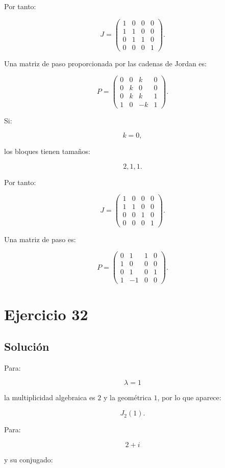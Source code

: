 \documentclass[11pt,a4paper]{article}
\begin{document}
Por tanto:

\[
\boxed{
J=
\begin{pmatrix}
1&0&0&0\\
1&1&0&0\\
0&1&1&0\\
0&0&0&1
\end{pmatrix}.
}
\]

Una matriz de paso proporcionada por las cadenas de Jordan es:

\[
\boxed{
P=
\begin{pmatrix}
0&0&k&0\\
0&k&0&0\\
0&k&k&1\\
1&0&-k&1
\end{pmatrix}.
}
\]

Si:

\[
k=0,
\]

los bloques tienen tamaños:

\[
2,1,1.
\]

Por tanto:

\[
\boxed{
J=
\begin{pmatrix}
1&0&0&0\\
1&1&0&0\\
0&0&1&0\\
0&0&0&1
\end{pmatrix}.
}
\]

Una matriz de paso es:

\[
\boxed{
P=
\begin{pmatrix}
0&1&1&0\\
1&0&0&0\\
0&1&0&1\\
1&-1&0&0
\end{pmatrix}.
}
\]

\section{Ejercicio 32}
\subsection{Solución}

Para:

\[
\lambda=1
\]

la multiplicidad algebraica es $2$ y la geométrica $1$, por lo que aparece:

\[
J_2(1).
\]

Para:

\[
2+i
\]

y su conjugado:
\end{document}
